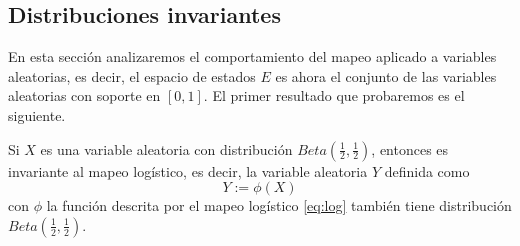\documentclass[../Main.tex]{subfiles}
\begin{document}
\subsection{Distribuciones invariantes}
En esta sección analizaremos el comportamiento del mapeo aplicado a variables aleatorias, es decir, el espacio de estados $E$ es ahora el conjunto de las variables aleatorias con soporte en $[0,1]$. El primer resultado que probaremos es el siguiente. 
\begin{proposition}\label{prop:log_unif}
Si $X$ es una variable aleatoria con distribución $Beta\left(\frac{1}{2},\frac{1}{2}\right)$, entonces es invariante al mapeo logístico, es decir, la variable aleatoria $Y$ definida como  $$Y:=\phi(X)$$ con $\phi$ la función descrita por el mapeo logístico \ref{eq:log} también tiene distribución $Beta\left(\frac{1}{2},\frac{1}{2}\right)$.
\end{proposition}
\end{document}
